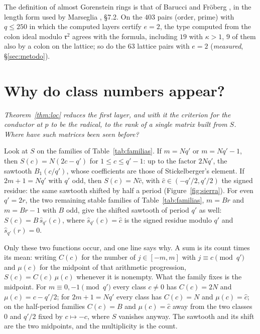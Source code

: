 \documentclass[11pt,a4paper]{article}
\theoremstyle{definition}
\newcommand{\rad}{\mathfrak{r}}
\newcommand{\pregunta}[1]{\par\smallskip\noindent\emph{#1}\par\smallskip}
\begin{document}
\noindent The definition of almost Gorenstein rings is that of Barucci and Fröberg \cite{BF97}, in the length form used
by Marseglia \cite{Mars24}, \S7.2. On the $403$ pairs (order, prime) with $q\le250$ in which the computed layers certify $e=2$, the
type computed from the colon ideal modulo $\rad^2$ agrees with the formula, including $19$ with $\kappa>1$, $9$ of them
also by a colon on the lattice; so do the $63$ lattice pairs with $e=2$ (\emph{measured}, \S\ref{sec:metodo}).

\section{Why do class numbers appear?}\label{sec:clase}

\pregunta{Theorem~\ref{thm:loc} reduces the first layer, and with it the criterion for the conductor at $p$ to be
the radical, to the rank of a single matrix built from $S$.
Where have such matrices been seen before?}

\noindent Look at $S$ on the families of Table~\ref{tab:familias}. If $m=Nq'$ or $m=Nq'-1$, then
$S(c)=N(2c-q')$ for $1\le c\le q'-1$: up to the factor $2Nq'$, the sawtooth $B_1(c/q')$, whose coefficients are
those of Stickelberger's element. If $2m+1=Nq'$ with $q'$ odd, then $S(c)=N\hat c$, with $\hat c\in(-q'/2,q'/2)$
the signed residue: the same sawtooth shifted by half a period (Figure~\ref{fig:sierra}). For even $q'=2r$,
the two remaining stable families of Table~\ref{tab:familias}, $m=Br$ and $m=Br-1$ with $B$ odd, give the shifted
sawtooth of period $q'$ as well: $S(c)=B\,\hat s_{q'}(c)$, where $\hat s_{q'}(c)=\hat c$ is the signed residue modulo
$q'$ and $\hat s_{q'}(r)=0$.

\noindent Only these two functions occur, and one line says why. A sum is its count times its mean: writing $C(c)$
for the number of $j\in[-m,m]$ with $j\equiv c\pmod{q'}$ and $\mu(c)$ for the midpoint of that arithmetic
progression, $S(c)=C(c)\,\mu(c)$ whenever it is nonempty. What the family fixes is the midpoint. For
$m\equiv0,-1\pmod{q'}$ every class $c\neq0$ has $C(c)=2N$ and $\mu(c)=c-q'/2$; for $2m+1=Nq'$ every
class has $C(c)=N$ and $\mu(c)=\hat c$; on the half-period families $C(c)=B$ and $\mu(c)=\hat c$ away from the two
classes $0$ and $q'/2$ fixed by $c\mapsto-c$, where $S$ vanishes anyway. The sawtooth and its shift are the two
midpoints, and the multiplicity is the count.
\end{document}
